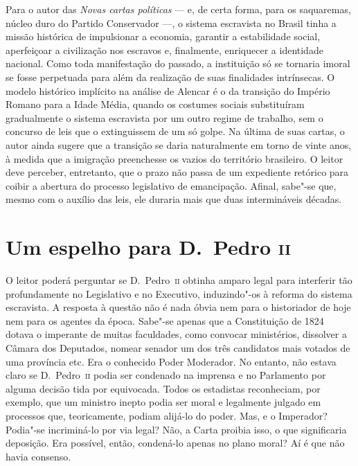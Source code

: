 Para o autor das \textit{Novas cartas políticas} --- e, de certa forma,
para os saquaremas, núcleo duro do Partido Conservador ---, o sistema
escravista no Brasil tinha a missão histórica de impulsionar a
economia, garantir a estabilidade social, aperfeiçoar a civilização nos
escravos e, finalmente, enriquecer a identidade nacional. Como toda
manifestação do passado, a instituição só se tornaria imoral se fosse
perpetuada para além da realização de suas finalidades intrínsecas. O
modelo histórico implícito na análise de Alencar é o da transição do
Império Romano para a Idade Média, quando os costumes sociais
substituíram gradualmente o sistema escravista por um outro regime de
trabalho, sem o concurso de leis que o extinguissem de um só golpe. Na
última de suas cartas, o autor ainda sugere que a transição se daria
naturalmente em torno de vinte anos, à  medida que a imigração
preenchesse os vazios do território brasileiro. O leitor deve perceber,
entretanto, que o prazo não passa de um expediente retórico para coibir
a abertura do processo legislativo de emancipação. Afinal, sabe"-se
que, mesmo com o auxílio das leis, ele duraria mais que duas intermináveis décadas. 

\section{Um espelho para D.~Pedro \textsc{ii}}

 O leitor poderá perguntar se D.~Pedro~\textsc{ii} obtinha amparo legal para
interferir tão profundamente no Legislativo e no Executivo,
induzindo"-os à  reforma do sistema escravista. A resposta à  questão não
é nada óbvia nem para o historiador de hoje nem para os agentes da
época. Sabe"-se apenas que a Constituição de 1824 dotava o imperante de
muitas faculdades, como convocar ministérios, dissolver a Câmara dos
Deputados, nomear senador um dos três candidatos mais votados de uma
província etc. Era o conhecido Poder Moderador. No entanto, não estava
claro se D.~Pedro~\textsc{ii} podia ser condenado na imprensa e no Parlamento
por alguma decisão tida por equivocada. Todos os estadistas
reconheciam, por exemplo, que um ministro inepto podia ser moral e
legalmente julgado em processos que, teoricamente, podiam alijá-lo do
poder. Mas, e o Imperador? Podia"-se incriminá-lo por via legal? Não, a
Carta proibia isso, o que significaria deposição. Era possível, então,
condená-lo apenas no plano moral? Aí é que não havia consenso. 

